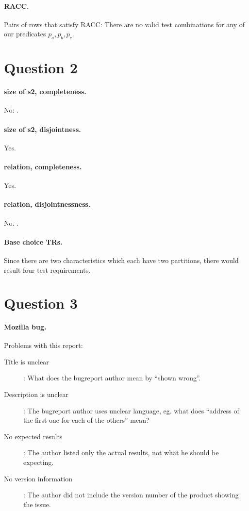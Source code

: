 \documentclass[12pt]{article}
\begin{document}
\paragraph{RACC.} Pairs of rows that satisfy RACC: There are no valid test combinations for any of our predicates $p_a, p_b, p_c$.


\section*{Question 2}
\paragraph{size of s2, completeness.} No: \rmfamily{}.
\paragraph{size of s2, disjointness.} Yes.
\paragraph{relation, completeness.} Yes.
\paragraph{relation, disjointnessness.} No. \rmfamily{}.
\paragraph{Base choice TRs.} Since there are two characteristics which each have two partitions, there would result four test requirements.


\section*{Question 3}
\paragraph{Mozilla bug.} Problems with this report:
\begin{description}
\item [Title is unclear]: What does the bugreport author mean by ``shown wrong''.
\item [Description is unclear]: The bugreport author uses unclear language, eg. what does ``address of the first one for each of the others'' mean?
\item [No expected results]: The author listed only the actual results, not what he should be expecting.
\item [No version information]: The author did not include the version number of the product showing the issue.
\end{description}
\end{document}
